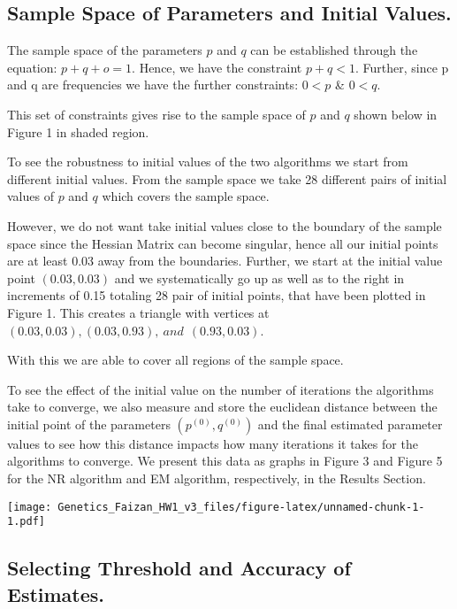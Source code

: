 \documentclass[]{article}
\begin{document}
\subsection{Sample Space of Parameters and Initial
Values.}\label{sample-space-of-parameters-and-initial-values.}

The sample space of the parameters \(p\) and \(q\) can be established
through the equation: \(p + q + o = 1\). Hence, we have the constraint
\(p + q < 1\). Further, since p and q are frequencies we have the
further constraints: \(0 < p\) \& \(0 < q\).

This set of constraints gives rise to the sample space of \(p\) and
\(q\) shown below in Figure 1 in shaded region.

To see the robustness to initial values of the two algorithms we start
from different initial values. From the sample space we take 28
different pairs of initial values of \(p\) and \(q\) which covers the
sample space.

However, we do not want take initial values close to the boundary of the
sample space since the Hessian Matrix can become singular, hence all our
initial points are at least 0.03 away from the boundaries. Further, we
start at the initial value point \((0.03, 0.03)\) and we systematically
go up as well as to the right in increments of 0.15 totaling 28 pair of
initial points, that have been plotted in Figure 1. This creates a
triangle with vertices at
\((0.03, 0.03), (0.03, 0.93), \: and \: \: (0.93, 0.03)\).

With this we are able to cover all regions of the sample space.

To see the effect of the initial value on the number of iterations the
algorithms take to converge, we also measure and store the euclidean
distance between the initial point of the parameters
\((p^{(0)}, q^{(0)})\) and the final estimated parameter values to see
how this distance impacts how many iterations it takes for the
algorithms to converge. We present this data as graphs in Figure 3 and
Figure 5 for the NR algorithm and EM algorithm, respectively, in the
Results Section.

\texttt{[image: Genetics\_Faizan\_HW1\_v3\_files/figure-latex/unnamed-chunk-1-1.pdf]}

\subsection{Selecting Threshold and Accuracy of
Estimates.}\label{selecting-threshold-and-accuracy-of-estimates.}
\end{document}
